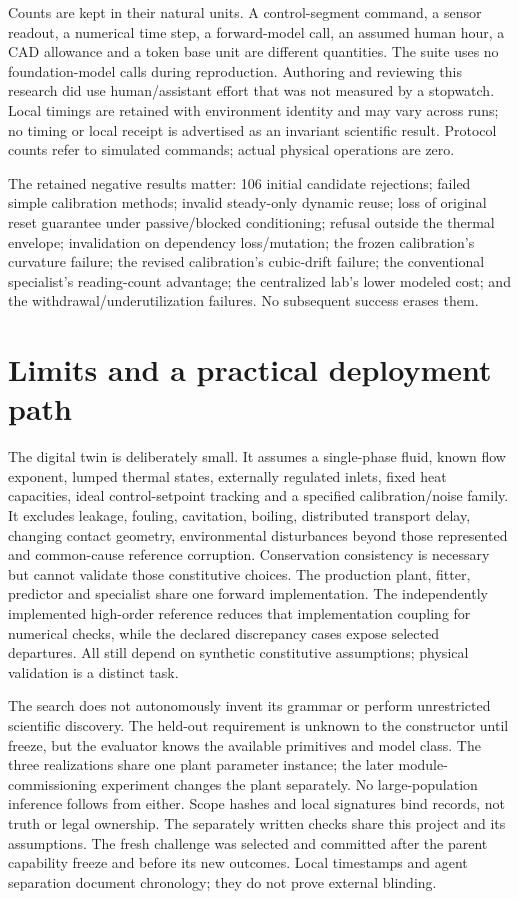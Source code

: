 \documentclass[11pt,letterpaper]{article}
\begin{document}


Counts are kept in their natural units. A control-segment command, a sensor readout, a numerical time step, a forward-model call, an assumed human hour, a CAD allowance and a token base unit are different quantities. The suite uses no foundation-model calls during reproduction. Authoring and reviewing this research did use human/assistant effort that was not measured by a stopwatch. Local timings are retained with environment identity and may vary across runs; no timing or local receipt is advertised as an invariant scientific result. Protocol counts refer to simulated commands; actual physical operations are zero.

The retained negative results matter: 106 initial candidate rejections; failed simple calibration methods; invalid steady-only dynamic reuse; loss of original reset guarantee under passive/blocked conditioning; refusal outside the thermal envelope; invalidation on dependency loss/mutation; the frozen calibration's curvature failure; the revised calibration's cubic-drift failure; the conventional specialist's reading-count advantage; the centralized lab's lower modeled cost; and the withdrawal/underutilization failures. No subsequent success erases them.

\section{Limits and a practical deployment path}
\label{sec:limits}
The digital twin is deliberately small. It assumes a single-phase fluid, known flow exponent, lumped thermal states, externally regulated inlets, fixed heat capacities, ideal control-setpoint tracking and a specified calibration/noise family. It excludes leakage, fouling, cavitation, boiling, distributed transport delay, changing contact geometry, environmental disturbances beyond those represented and common-cause reference corruption. Conservation consistency is necessary but cannot validate those constitutive choices. The production plant, fitter, predictor and specialist share one forward implementation. The independently implemented high-order reference reduces that implementation coupling for numerical checks, while the declared discrepancy cases expose selected departures. All still depend on synthetic constitutive assumptions; physical validation is a distinct task.

The search does not autonomously invent its grammar or perform unrestricted scientific discovery. The held-out requirement is unknown to the constructor until freeze, but the evaluator knows the available primitives and model class. The three realizations share one plant parameter instance; the later module-commissioning experiment changes the plant separately. No large-population inference follows from either. Scope hashes and local signatures bind records, not truth or legal ownership. The separately written checks share this project and its assumptions. The fresh challenge was selected and committed after the parent capability freeze and before its new outcomes. Local timestamps and agent separation document chronology; they do not prove external blinding.
\end{document}
